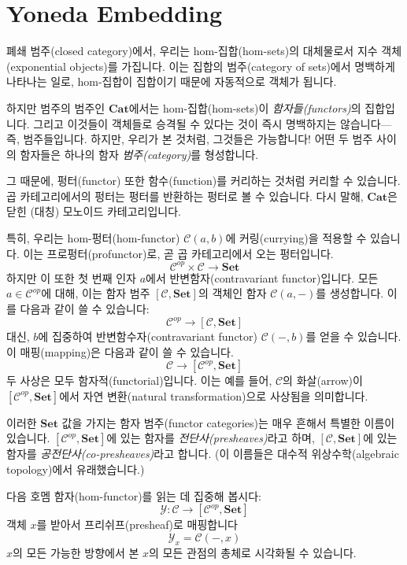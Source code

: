 \documentclass[DaoFP]{subfiles}
\begin{document}
\section{Yoneda Embedding}

폐쇄 범주(closed category)에서, 우리는 hom-집합(hom-sets)의 대체물로서 지수 객체(exponential objects)를 가집니다. 이는 집합의 범주(category of sets)에서 명백하게 나타나는 일로, hom-집합이 집합이기 때문에 자동적으로 객체가 됩니다.

하지만 범주의 범주인 $\mathbf{Cat}$에서는 hom-집합(hom-sets)이 \emph{함자들(functors)}의 집합입니다. 그리고 이것들이 객체들로 승격될 수 있다는 것이 즉시 명백하지는 않습니다---즉, 범주들입니다. 하지만, 우리가 본 것처럼, 그것들은 가능합니다! 어떤 두 범주 사이의 함자들은 하나의 함자 \emph{범주(category)}를 형성합니다.

그 때문에, 펑터(functor) 또한 함수(function)를 커리하는 것처럼 커리할 수 있습니다. 곱 카테고리에서의 펑터는 펑터를 반환하는 펑터로 볼 수 있습니다. 다시 말해, $\mathbf{Cat}$은 닫힌 (대칭) 모노이드 카테고리입니다.

특히, 우리는 hom-펑터(hom-functor) $\mathcal{C}(a, b)$에 커링(currying)을 적용할 수 있습니다. 이는 프로펑터(profunctor)로, 곧 곱 카테고리에서 오는 펑터입니다.
\[ \mathcal{C}^{op} \times \mathcal{C} \to  \mathbf{Set} \]
하지만 이 또한 첫 번째 인자 $a$에서 반변함자(contravariant functor)입니다. 모든 $a \in \mathcal{C}^{op}$에 대해, 이는 함자 범주 $ [\mathcal{C},  \mathbf{Set}] $의 객체인 함자 $\mathcal{C}(a, -)$를 생성합니다. 이를 다음과 같이 쓸 수 있습니다:
\[ \mathcal{C}^{op} \to [\mathcal{C},  \mathbf{Set}] \]
대신, $b$에 집중하여 반변함수자(contravariant functor) $\mathcal{C}(-, b)$를 얻을 수 있습니다. 이 매핑(mapping)은 다음과 같이 쓸 수 있습니다.
\[ \mathcal{C} \to [\mathcal{C}^{op},  \mathbf{Set}] \]
두 사상은 모두 함자적(functorial)입니다. 이는 예를 들어, $\mathcal{C}$의 화살(arrow)이 $[\mathcal{C}^{op}, \mathbf{Set}]$에서 자연 변환(natural transformation)으로 사상됨을 의미합니다.

이러한 $\mathbf{Set}$ 값을 가지는 함자 범주(functor categories)는 매우 흔해서 특별한 이름이 있습니다. $[\mathcal{C}^{op},  \mathbf{Set}]$에 있는 함자를 \emph{전단사(presheaves)}라고 하며, $[\mathcal{C},  \mathbf{Set}]$에 있는 함자를 \emph{공전단사(co-presheaves)}라고 합니다. (이 이름들은 대수적 위상수학(algebraic topology)에서 유래했습니다.)

다음 호멤 함자(hom-functor)를 읽는 데 집중해 봅시다:
\[ \mathcal{Y} \colon \mathcal{C} \to [\mathcal{C}^{op},  \mathbf{Set}] \]
객체 $x$를 받아서 프리쉬프(presheaf)로 매핑합니다
\[ \mathcal Y_x = \mathcal{C}(-, x) \]
$x$의 모든 가능한 방향에서 본 $x$의 모든 관점의 총체로 시각화될 수 있습니다.
\end{document}
